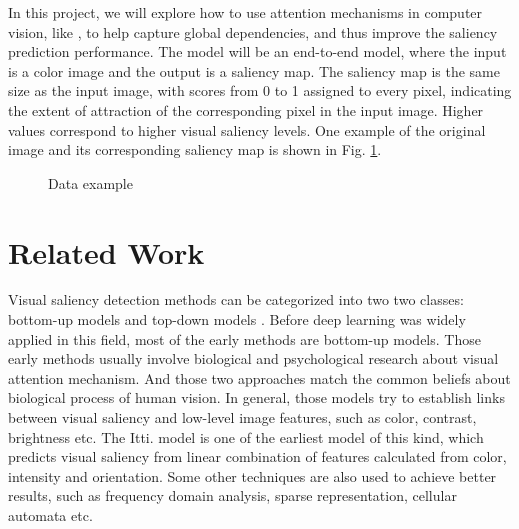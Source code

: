 \documentclass[12pt]{article}
\begin{document}
In this project, we will explore how to use attention mechanisms in computer vision, like \cite{zhangSelfAttentionGenerativeAdversarial2019a},
to help capture global dependencies, and thus improve the saliency prediction performance. 
The model will be an end-to-end model, where the input is a color image and the output is a saliency map.
The saliency map is the same size as the input image, with scores from 0 to 1 assigned to 
every pixel, indicating the extent of attraction of the corresponding pixel in the input image.
Higher values correspond to higher visual saliency levels.
One example of the original image and its corresponding saliency map is shown in Fig. \ref{img:data_example}.
\begin{figure}[!h]
    \centering
    \hspace{5mm}
    \caption{Data example}
    \label{img:data_example}
\end{figure}


\section{Related Work}

Visual saliency detection methods can be categorized into two two classes: bottom-up models and top-down models \cite{congReviewVisualSaliency2019}.
Before deep learning was widely applied in this field, most of the early methods are bottom-up models.
Those early methods usually involve biological and psychological research about visual attention mechanism. And those two approaches match the common beliefs about biological process of human vision.
In general, those models try to establish links between visual saliency and low-level image features, such as color, contrast, brightness etc. The Itti. model\cite{ittiModelSaliencybasedVisual1998}
is one of the earliest model of this kind, which predicts visual saliency from linear combination of features calculated from color, intensity and orientation.
Some other techniques are also used to achieve better results, such as frequency domain analysis, sparse representation, cellular automata etc. \cite{congReviewVisualSaliency2019}
\end{document}
